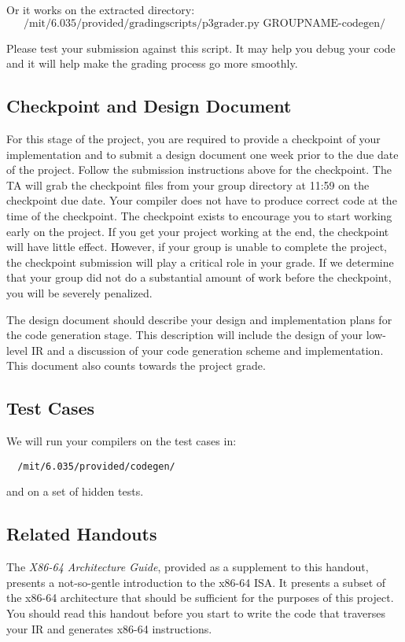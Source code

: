 Or it works on the extracted directory:
\[
\mbox{/mit/6.035/provided/gradingscripts/p3grader.py GROUPNAME-codegen/}
\]

Please test your submission against this script.  It may help you debug your
code and it will help make the grading process go more smoothly.


\subsection*{Checkpoint and Design Document}
For this stage of the project, you are required to provide a
checkpoint of your implementation and to submit a design document one
week prior to the due date of the project.  Follow the submission
instructions above for the checkpoint.  The TA will grab the
checkpoint files from your group directory at 11:59 on the checkpoint
due date.  Your compiler does not have to produce correct code at the
time of the checkpoint. The checkpoint exists to encourage you to
start working early on the project. If you get your project working at
the end, the checkpoint will have little effect. However, if your
group is unable to complete the project, the checkpoint submission
will play a critical role in your grade. If we determine that your
group did not do a substantial amount of work before the checkpoint,
you will be severely penalized.


The design document should describe your design and implementation
plans for the code generation stage.  This description will include
the design of your low-level IR and a discussion of your code
generation scheme and implementation.  This document also counts
towards the project grade.


\subsection*{Test Cases}

We will run your compilers on the test cases in:
\begin{verbatim}
  /mit/6.035/provided/codegen/
\end{verbatim}
and on a set of hidden tests.

\subsection*{Related Handouts}

The \textit{X86-64 Architecture Guide}, provided as a supplement to
this handout, presents a not-so-gentle introduction to the x86-64 ISA.  It
presents a subset of the x86-64 architecture that should be sufficient
for the purposes of this project. You should read this handout before
you start to write the code that traverses your IR and generates
x86-64 instructions.


